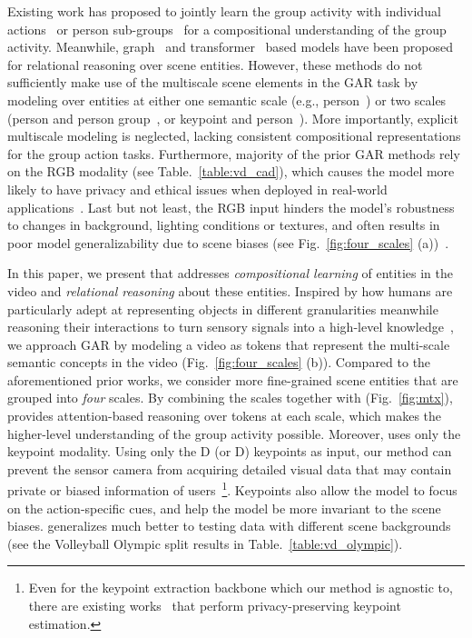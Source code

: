 \documentclass[runningheads]{llncs}
\begin{document}
Existing work has proposed to jointly learn the group activity with individual actions~\cite{ibrahim2016hierarchical,cern,stagnet,rcrg,ssu,crm} or person sub-groups~\cite{GroupFormer,nakatani2021group,ehsanpour2020joint} for
a compositional understanding of the group activity. Meanwhile, graph~\cite{yuan2021spatio,ibrahim2018hierarchical,arg,prl} and transformer~\cite{actor-transformer,GroupFormer} based models have been proposed for relational reasoning over scene entities. However,
these methods 
do not sufficiently make use of the 
multiscale scene elements in the GAR task
by modeling over entities at either one semantic scale (e.g., person~\cite{actor-transformer,yuan2021spatio,arg,prl}) or two scales (person and person group~\cite{GroupFormer,nakatani2021group,ehsanpour2020joint}, or keypoint and person~\cite{GIRN}).
More importantly, explicit multiscale modeling is neglected, lacking consistent 
compositional representations for
the 
group action tasks. 
Furthermore, majority of the prior GAR methods rely on the RGB modality (see Table.~\ref{table:vd_cad}), which causes the model more likely to have privacy and ethical issues when deployed in real-world applications~\cite{hinojosa2021learning}.
Last but not least, the RGB input hinders the model's robustness to changes in background, lighting conditions or textures, and often results in poor model generalizability due to scene biases (see Fig.~\ref{fig:four_scales} (a))~\cite{scenebias,singh2020don}.



In this paper, we present \ours 
that
addresses \textit{compositional learning} of entities in the video and \textit{relational reasoning} about these entities. 
Inspired by how humans are particularly adept at
representing
objects in different granularities meanwhile reasoning  their interactions
to turn 
sensory signals into a high-level knowledge~\cite{hudson2019learning,lake2017building}, 
we approach GAR
by modeling a video as
tokens that represent the multi-scale semantic concepts in the video (Fig.~\ref{fig:four_scales} (b)).
Compared to the aforementioned prior works, we consider more fine-grained scene entities that are grouped into \textit{four} scales.
By combining the scales together with \mtx (Fig.~\ref{fig:mtx}), 
\ours provides attention-based reasoning over tokens at each scale,
which makes the higher-level understanding of the group activity possible. 
Moreover, \ours uses only the keypoint modality.
Using only the D (or D) keypoints as input, our method can prevent the sensor camera from acquiring detailed visual data that may contain private or biased information of users~\footnote{Even for the keypoint extraction backbone which our method is agnostic to, there are existing works~\cite{hinojosa2021learning} that perform privacy-preserving keypoint estimation.}. 
Keypoints also allow the model to focus on the action-specific cues, and help the model be more invariant to the scene biases.
\ours 
generalizes much better 
to testing data with different scene backgrounds 
(see the Volleyball Olympic split results in Table.~\ref{table:vd_olympic}).
\end{document}
